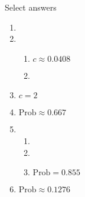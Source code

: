 \documentclass{article}
\begin{document}
Select answers\bigskip
\begin{enumerate}
    \item 
    
    \item 
    \begin{enumerate}
        \item $c \approx 0.0408$
        \item 
    \end{enumerate}
    
    \item $c = 2$
    
    \item $\text{Prob} \approx 0.667$
    
    \item 
    \begin{enumerate}
        \item 
        \item 
        \item $\text{Prob} = 0.855$
    \end{enumerate}
    
    \item $\text{Prob} \approx 0.1276$

\end{enumerate}
\end{document}

